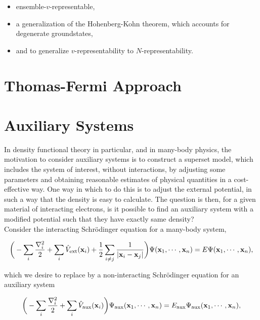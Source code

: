 \documentclass{homework}
\begin{document}
\begin{itemize}
    \item ensemble-$v$-representable, 
    \item a generalization of the Hohenberg-Kohn theorem, which accounts for degenerate groundstates,
    \item and to generalize $v$-representability to $N$-representability. \\
\end{itemize}

\section{Thomas-Fermi Approach}

\section{Auxiliary Systems}

In density functional theory in particular, and in many-body physics, the motivation to consider auxiliary systems is to construct a superset model, which includes the system of interest, without interactions, by adjusting some parameters and obtaining reasonable estimates of physical quantities in a cost-effective way. One way in which to do this is to adjust the external potential, in such a way that the density is easy to calculate. The question is then, for a given material of interacting electrons, is it possible to find an auxiliary system with a modified potential such that they have exactly same density? \\

Consider the interacting Schr\"odinger equation for a many-body system, 

\begin{equation}
    \bigg(-\sum_{i} \frac{\nabla_i^2}{2} + \sum_{i}\hat{V}_{\textnormal{ext}}({\bf x}_i)  + \frac{1}{2} \sum_{i\neq j} \frac{1}{|{\bf x}_i - {\bf x}_j|}\bigg) \Psi({\bf x}_1, \cdots, {\bf x}_n) = E \Psi({\bf x}_1, \cdots, {\bf x}_n),
\end{equation}

which we desire to replace by a non-interacting Schr\"odinger equation for an auxiliary system 

\begin{equation}
    \bigg(-\sum_{i} \frac{\nabla_i^2}{2} + \sum_{i}\hat{V}_{\textnormal{aux}}({\bf x}_i)  \bigg) \Psi_{\textnormal{aux}}({\bf x}_1, \cdots, {\bf x}_n) = E_{\textnormal{aux}} \Psi_{\textnormal{aux}}({\bf x}_1, \cdots, {\bf x}_n),
\end{equation}
\end{document}
